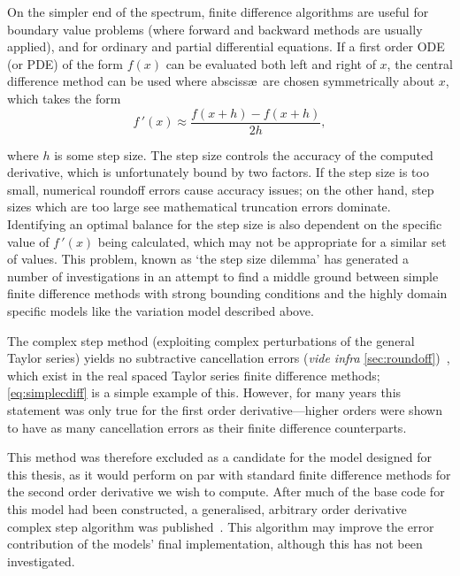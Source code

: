 On the simpler end of the spectrum, finite difference algorithms are useful for boundary value problems (where forward and backward methods are usually applied), and for ordinary and partial differential equations.
If a first order ODE (or PDE) of the form $f(x)$ can be evaluated both left and right of $x$, the central difference method can be used where absciss\ae\ are chosen symmetrically about $x$, which takes the form
\begin{equation}
f\,'(x) \approx \frac{f(x+h)-f(x+h)}{2h},\label{eq:simplecdiff}
\end{equation}

where $h$ is some step size.
The step size controls the accuracy of the computed derivative, which is unfortunately bound by two factors.
If the step size is too small, numerical roundoff errors cause accuracy issues; on the other hand, step sizes which are too large see mathematical truncation errors dominate.
Identifying an optimal balance for the step size is also dependent on the specific value of $f\,'(x)$ being calculated, which may not be appropriate for a similar set of values.
This problem, known as `the step size dilemma' has generated a number of investigations in an attempt to find a middle ground between simple finite difference methods with strong bounding conditions and the highly domain specific models like the variation model described above.

The complex step method (exploiting complex perturbations of the general Taylor series) yields no subtractive cancellation errors (\textit{vide infra} \cref{sec:roundoff})~\cite{Squire1998}, which exist in the real spaced Taylor series finite difference methods; \cref{eq:simplecdiff} is a simple example of this.
However, for many years this statement was only true for the first order derivative---higher orders were shown to have as many cancellation errors as their finite difference counterparts.

This method was therefore excluded as a candidate for the model designed for this thesis, as it would perform on par with standard finite difference methods for the second order derivative we wish to compute.
After much of the base code for this model had been constructed, a generalised, arbitrary order derivative complex step algorithm was published~\cite{Lantoine2012}.
This algorithm may improve the error contribution of the models' final implementation, although this has not been investigated.

